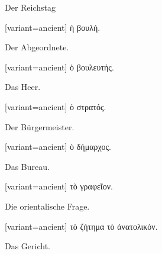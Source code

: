 Der Reichs\textcompwordmark{}tag 

\switchcolumn

\begin{greek}[variant=ancient]%
ἡ βουλή.

\end{greek}%
\switchcolumn*

Der Abgeordnete.

\switchcolumn

\begin{greek}[variant=ancient]%
ὁ βουλευτής.

\end{greek}%
\switchcolumn*

Das Heer.

\switchcolumn

\begin{greek}[variant=ancient]%
ὁ στρατός.

\end{greek}%
\switchcolumn*

Der Bürgermeister.

\switchcolumn

\begin{greek}[variant=ancient]%
ὁ δήμαρχος.

\end{greek}%
\switchcolumn*

Das Bureau.

\switchcolumn

\begin{greek}[variant=ancient]%
τὸ γραφεῖον.

\end{greek}%
\switchcolumn*

Die orientalische Frage.

\switchcolumn

\begin{greek}[variant=ancient]%
τὸ ζήτημα τὸ ἀνατολικόν.

\end{greek}%
\switchcolumn*

Das Gericht.

